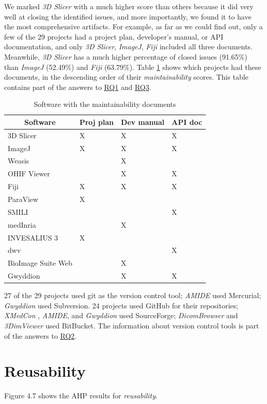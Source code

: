 We marked \textit{3D Slicer} with a much higher score than others because it did very well at closing the identified issues, and more importantly, we found it to have the most comprehensive artifacts. For example, as far as we could find out, only a few of the 29 projects had a project plan, developer's manual, or API documentation, and only \textit{3D Slicer}, \textit{ImageJ}, \textit{Fiji} included all three documents. Meanwhile, \textit{3D Slicer} has a much higher percentage of closed issues (91.65\%) than \textit{ImageJ} (52.49\%) and \textit{Fiji} (63.79\%). Table \ref{tab_maintainability_docs} shows which projects had these documents, in the descending order of their \textit{maintainability} scores. This table contains part of the answers to \hyperlink{rq1}{RQ1} and \hyperlink{rq3}{RQ3}.

\begin{table}[H]
\centering
\begin{tabular}{llll}
\hline
\multicolumn{1}{c}{Software} & Proj plan & Dev manual & API doc \\ \hline
3D Slicer & X & X & X \\
ImageJ & X & X & X \\
Weasis &  & X &  \\
OHIF Viewer &  & X & X \\
Fiji & X & X & X \\
ParaView & X &  &  \\
SMILI &  &  & X \\
medInria &  & X &  \\
INVESALIUS 3 & X &  &  \\
dwv &  &  & X \\
BioImage Suite Web &  & X &  \\
Gwyddion &  & X & X \\ \hline
\end{tabular}
\caption{\label{tab_maintainability_docs}Software with the maintainability documents}
\end{table}

27 of the 29 projects used git as the version control tool; \textit{AMIDE} used Mercurial; \textit{Gwyddion} used Subversion. 24 projects used GitHub for their repositories; \textit{XMedCon
}, \textit{AMIDE}, and \textit{Gwyddion} used SourceForge; \textit{DicomBrowser} and \textit{3DimViewer} used BitBucket. The information about version control tools is part of the answers to \hyperlink{rq2}{RQ2}.

\section{Reusability}
\label{sec_result_reusability}
Figure 4.7 shows the AHP results for \textit{reusability}.

